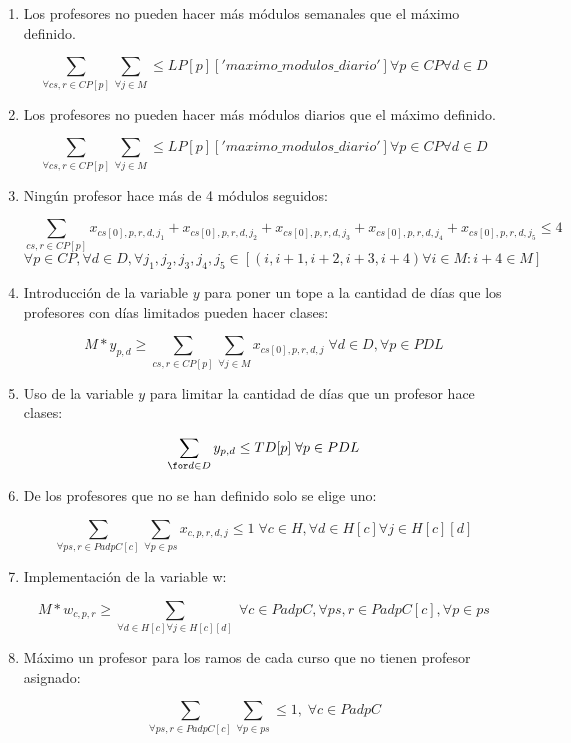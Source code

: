 \documentclass[letterpaper]{article}
\begin{document}
\begin{enumerate}
    \item Los profesores no pueden hacer más módulos semanales que el máximo definido.
    
    $$\sum_{\forall cs,r \in CP[p]} \sum_{\forall j \in M} \leq LP[p]['maximo\_modulos\_diario'] \forall p \in CP \forall d \in D$$

    \item Los profesores no pueden hacer más módulos diarios que el máximo definido.
    
    $$\sum_{\forall cs,r \in CP[p]} \sum_{\forall j \in M} \leq LP[p]['maximo\_modulos\_diario'] \forall p \in CP \forall d \in D$$

    \item Ningún profesor hace más de 4 módulos seguidos:

    $$\sum_{cs,r \in CP[p]} x_{cs[0],p,r,d,j_1} + x_{cs[0],p,r,d,j_2} + x_{cs[0],p,r,d,j_3} + x_{cs[0],p,r,d,j_4} + x_{cs[0],p,r,d,j_5} \leq 4$$
    $$\forall p \in CP, \forall d \in D, \forall j_1,j_2,j_3,j_4,j_5 \in [(i,i+1,i+2,i+3,i+4) \forall i \in M : i+4 \in M]$$
    
    \item Introducción de la variable $y$ para poner un tope a la cantidad de días que los profesores con días limitados pueden hacer clases:

    $$M * y_{p,d} \geq \sum_{cs,r \in CP[p]} \sum_{\forall j \in M} x_{cs[0],p,r,d,j} \; \forall d \in D, \forall p \in PDL$$

    \item Uso de la variable $y$ para limitar la cantidad de días que un profesor hace clases:

    $$\sum_{\for d \in D} y_{p,d} \leq TD[p] \; \forall p \in PDL$$

    \item De los profesores que no se han definido solo se elige uno:

    $$\sum_{\forall ps,r \in PadpC[c]} \sum_{\forall p \in ps} x_{c,p,r,d,j} \leq 1 \; \forall c \in H, \forall d \in H[c] \forall j \in H[c][d]$$

    \item Implementación de la variable w:

    $$M * w_{c,p,r} \geq \sum_{\forall d \in H[c] \forall j \in H[c][d]} \; \forall c \in PadpC, \forall ps,r \in PadpC[c], \forall p \in ps$$

    \item Máximo un profesor para los ramos de cada curso que no tienen profesor asignado:

    $$\sum_{\forall ps,r \in PadpC[c]} \sum_{\forall p \in ps} \leq 1, \; \forall c \in PadpC$$
\end{enumerate}
\end{document}
